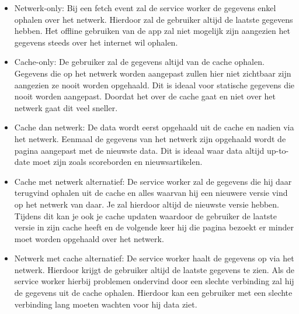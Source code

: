 \begin{itemize}
	\item Netwerk-only: Bij een fetch event zal de service worker de gegevens enkel ophalen over het netwerk. Hierdoor zal de gebruiker altijd de laatste gegevens hebben. Het offline gebruiken van de app zal niet mogelijk zijn aangezien het gegevens steeds over het internet wil ophalen.
	\item Cache-only: De gebruiker zal de gegevens altijd van de cache ophalen. Gegevens die op het netwerk worden aangepast zullen hier niet zichtbaar zijn aangezien ze nooit worden opgehaald. Dit is ideaal voor statische gegevens die nooit worden aangepast. Doordat het over de cache gaat en niet over het netwerk gaat dit veel sneller.
	\item Cache dan netwerk: De data wordt eerst opgehaald uit de cache en nadien via het netwerk. Eenmaal de gegevens van het netwerk zijn opgehaald wordt de pagina aangepast met de nieuwste data. Dit is ideaal waar data altijd up-to-date moet zijn zoals scoreborden en nieuwsartikelen.
	\item Cache met netwerk alternatief: De service worker zal de gegevens die hij daar terugvind ophalen uit de cache en alles waarvan hij een nieuwere versie vind op het netwerk van daar. Je zal hierdoor altijd de nieuwste versie hebben. Tijdens dit kan je ook je cache updaten waardoor de gebruiker de laatste versie in zijn cache heeft en de volgende keer hij die pagina bezoekt er minder moet worden opgehaald over het netwerk. 
	\item Netwerk met cache alternatief: De service worker haalt de gegevens op via het netwerk. Hierdoor krijgt de gebruiker altijd de laatste gegevens te zien. Als de service worker hierbij problemen ondervind door een slechte verbinding zal hij de gegevens uit de cache ophalen. Hierdoor kan een gebruiker met een slechte verbinding lang moeten wachten voor hij data ziet.
\end{itemize}

